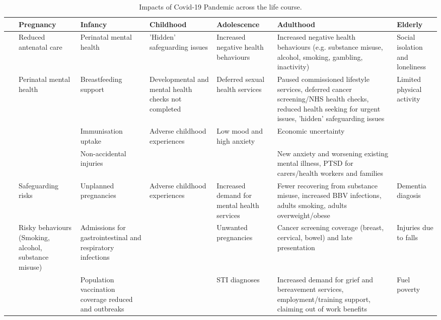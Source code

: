 \begin{table*}[]
    \small
    \caption[Impacts of Covid-19 Pandemic across the life course]{Impacts of Covid-19 Pandemic across the life course.}
    \label{fig:covid-impacts}
    \centering
    \begin{tabular}{@{}M{4mm}M{26mm}M{30mm}M{30mm}M{30mm}M{80mm}M{26mm}@{}}
        \toprule
        \ & \textbf{Pregnancy} & \textbf{Infancy} & \textbf{Childhood} & \textbf{Adolescence} & \textbf{Adulthood} & \textbf{Elderly} \\
        \midrule
         & Reduced antenatal care & Perinatal mental health & 'Hidden' safeguarding issues & Increased negative health behaviours & Increased negative health behaviours (e.g. substance misuse, alcohol, smoking, gambling, inactivity) & Social isolation and loneliness \\
        \ & Perinatal mental health & Breastfeeding support & Developmental and mental health checks not completed & Deferred sexual health services & Paused commissioned lifestyle services, deferred cancer screening/NHS health checks, reduced health seeking for urgent issues, 'hidden' safeguarding issues & Limited physical activity \\
        \ & \ & Immunisation uptake& Adverse childhood experiences & Low mood and high anxiety & Economic uncertainty & \ \\
        \ & \ & Non-accidental injuries & \ & \  & New anxiety and worsening existing mental illness, PTSD for carers/health workers and families & \ \\
        \cmidrule(r){2-7}
         & Safeguarding risks & Unplanned pregnancies & Adverse childhood experiences & Increased demand for mental health services & Fewer recovering from substance misuse, increased BBV infections, adults smoking, adults overweight/obese & Dementia diagosis \\
        \ & Risky behaviours (Smoking, alcohol, substance misuse) & Admissions for gastrointestinal and respiratory infections & \ & Unwanted pregnancies & Cancer screening coverage (breast, cervical, bowel) and late presentation & Injuries due to falls \\
        \ & \ & Population vaccination coverage reduced and outbreaks&\  & STI diagnoses & Increased demand for grief and bereavement services, employment/training support, claiming out of work benefits & Fuel poverty \\

\end{tabular}
\end{table*}
